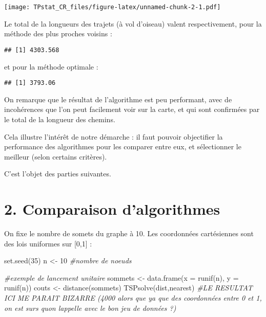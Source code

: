 \documentclass[
]{article}
\newenvironment{Shaded}{\begin{snugshade}}{\end{snugshade}}
\newcommand{\AttributeTok}[1]{\textcolor[rgb]{0.77,0.63,0.00}{#1}}
\newcommand{\CommentTok}[1]{\textcolor[rgb]{0.56,0.35,0.01}{\textit{#1}}}
\newcommand{\DecValTok}[1]{\textcolor[rgb]{0.00,0.00,0.81}{#1}}
\newcommand{\FunctionTok}[1]{\textcolor[rgb]{0.00,0.00,0.00}{#1}}
\newcommand{\NormalTok}[1]{#1}
\newcommand{\OtherTok}[1]{\textcolor[rgb]{0.56,0.35,0.01}{#1}}
\newcommand{\StringTok}[1]{\textcolor[rgb]{0.31,0.60,0.02}{#1}}
\begin{document}
\texttt{[image: TPstat\_CR\_files/figure-latex/unnamed-chunk-2-1.pdf]}

Le total de la longueurs des trajets (à vol d'oiseau) valent
respectivement, pour la méthode des plus proches voisins :

\begin{verbatim}
## [1] 4303.568
\end{verbatim}

et pour la méthode optimale :

\begin{verbatim}
## [1] 3793.06
\end{verbatim}

On remarque que le résultat de l'algorithme est peu performant, avec de
incohérences que l'on peut facilement voir sur la carte, et qui sont
confirmées par le total de la longueur des chemins.

Cela illustre l'intérêt de notre démarche : il faut pouvoir objectifier
la performance des algorithmes pour les comparer entre eux, et
sélectionner le meilleur (selon certains critères).

C'est l'objet des parties suivantes.

\hypertarget{comparaison-dalgorithmes}{%
\section{2. Comparaison d'algorithmes}\label{comparaison-dalgorithmes}}

On fixe le nombre de somets du graphe à 10. Les coordonnées cartésiennes
sont des lois uniformes sur {[}0,1{]} :

\begin{Shaded}
\begin{Highlighting}[]
\FunctionTok{set.seed}\NormalTok{(}\DecValTok{35}\NormalTok{)}
\NormalTok{n }\OtherTok{\textless{}{-}} \DecValTok{10} \CommentTok{\#nombre de noeuds}

\CommentTok{\#exemple de lancement unitaire}
\NormalTok{sommets }\OtherTok{\textless{}{-}} \FunctionTok{data.frame}\NormalTok{(}\AttributeTok{x =} \FunctionTok{runif}\NormalTok{(n), }\AttributeTok{y =} \FunctionTok{runif}\NormalTok{(n))}
\NormalTok{couts }\OtherTok{\textless{}{-}} \FunctionTok{distance}\NormalTok{(sommets)}
\FunctionTok{TSPsolve}\NormalTok{(dist,}\StringTok{\textquotesingle{}nearest\textquotesingle{}}\NormalTok{) }\CommentTok{\#LE RESULTAT ICI ME PARAIT BIZARRE (4000 alors que ya que des coordonnées entre 0 et 1, on est surs qu\textquotesingle{}on l\textquotesingle{}appelle avec le bon jeu de données ?)}
\end{Highlighting}
\end{Shaded}
\end{document}
